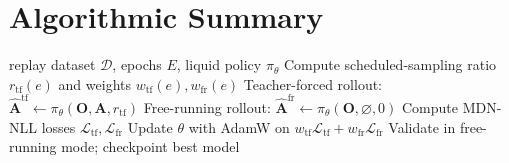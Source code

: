 \documentclass{article}
\begin{document}
\section{Algorithmic Summary}
\begin{algorithm}[t]
\caption{Tutorial Recipe: Liquid Imitation Learning for Push-T}
\begin{algorithmic}[1]
\Require replay dataset $\mathcal{D}$, epochs $E$, liquid policy $\pi_\theta$
    \State Compute scheduled-sampling ratio $r_{\mathrm{tf}}(e)$ and weights $w_{\mathrm{tf}}(e),w_{\mathrm{fr}}(e)$
        \State Teacher-forced rollout: $\hat{\mathbf{A}}^{\mathrm{tf}}\leftarrow\pi_\theta(\mathbf{O},\mathbf{A},r_{\mathrm{tf}})$
        \State Free-running rollout: $\hat{\mathbf{A}}^{\mathrm{fr}}\leftarrow\pi_\theta(\mathbf{O},\varnothing,0)$
        \State Compute MDN-NLL losses $\mathcal{L}_{\mathrm{tf}},\mathcal{L}_{\mathrm{fr}}$
        \State Update $\theta$ with AdamW on $w_{\mathrm{tf}}\mathcal{L}_{\mathrm{tf}}+w_{\mathrm{fr}}\mathcal{L}_{\mathrm{fr}}$
    \EndFor
    \State Validate in free-running mode; checkpoint best model
\EndFor
\end{algorithmic}
\end{algorithm}
\end{document}
